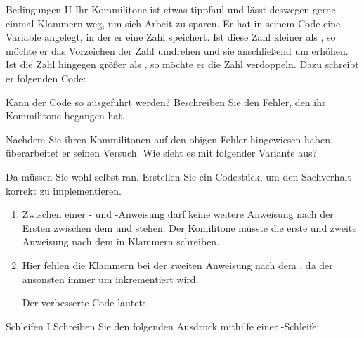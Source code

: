 \documentclass{../tuda-exercise}
\begin{document}
  \begin{task}[credit=\stars{1}{3}]{Bedingungen II}
    Ihr Kommilitone ist etwas tippfaul und lässt deswegen gerne einmal Klammern weg, um sich
    Arbeit zu sparen. Er hat in seinem Code eine Variable  angelegt, in
    der er eine Zahl speichert. Ist diese Zahl kleiner als , so möchte er das
    Vorzeichen der Zahl umdrehen und sie anschließend um  erhöhen. Ist die Zahl
    hingegen größer als , so möchte er die Zahl verdoppeln. Dazu schreibt er
    folgenden Code:

    

    Kann der Code so ausgeführt werden? Beschreiben Sie den Fehler, den ihr Kommilitone begangen
    hat.

    \br

    Nachdem Sie ihren Kommilitonen auf den obigen Fehler hingewiesen haben, überarbeitet er
    seinen Versuch. Wie sieht es mit folgender Variante aus?

    

    Da müssen Sie wohl selbst ran. Erstellen Sie ein Codestück, um den Sachverhalt korrekt zu
    implementieren.

    \begin{solution}
      \begin{enumerate}
        \item Zwischen einer - und -Anweisung darf keine
        weitere Anweisung nach der Ersten zwischen dem  und
         stehen. Der Komilitone müsste die erste und zweite Anweisung nach dem
         in Klammern schreiben.
        \item Hier fehlen die Klammern bei der zweiten Anweisung nach dem , da der
         ansonsten immer um  inkrementiert wird.

        \br

        Der verbesserte Code lautet:
      \end{enumerate}

      
    \end{solution}
  \end{task}

  \clearpagesolution

  \begin{task}[credit=\stars{1}{3}]{Schleifen I}
    Schreiben Sie den folgenden Ausdruck mithilfe einer -Schleife:

    

    \begin{solution}
      
    \end{solution}
  \end{task}
\end{document}
